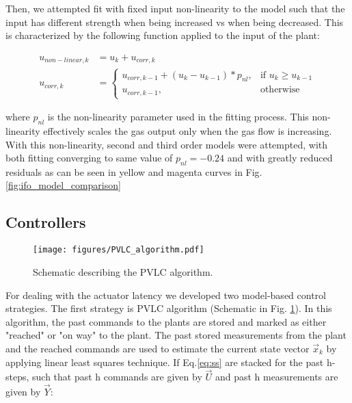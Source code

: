 Then, we attempted fit with fixed input non-linearity to the model such that the input has different strength when being increased vs when being decreased. This is characterized by the following function applied to the input of the plant:

\begin{equation}
    \begin{split}
        u_{non-linear, k} &= u_k + u_{corr, k} \\
        u_{corr, k} &= 
        \begin{cases}
            u_{corr, k-1} + (u_k - u_{k-1}) * p_{nl} ,& \text{if } u_k \geq u_{k-1}\\
            u_{corr, k-1},              & \text{otherwise}
        \end{cases}
\end{split}
\end{equation}

where $p_{nl}$ is the non-linearity parameter used in the fitting process. This non-linearity effectively scales the gas output only when the gas flow is increasing. With this non-linearity, second and third order models were attempted, with both fitting converging to same value of $p_{nl}=-0.24$ and with greatly reduced residuals as can be seen in yellow and magenta curves in Fig. \ref{fig:ifo_model_comparison}

\subsection{Controllers}{\label{subssec:controllers}}

\begin{figure}[!h]
 \centering
 \texttt{[image: figures/PVLC\_algorithm.pdf]}
 \caption{Schematic describing the \ac{PVLC} algorithm.}
 \label{fig:pvlc}
\end{figure}

For dealing with the actuator latency we developed two model-based control strategies. The first strategy is \ac{PVLC} algorithm (Schematic in Fig. \ref{fig:pvlc}). In this algorithm, the past commands to the plants are stored and marked as either "reached" or "on way" to the plant. The past stored measurements from the plant and the reached commands are used to estimate the current state vector $\vec{x}_k$ by applying linear least squares technique. If Eq.\ref{eq:ss} are stacked for the past h-steps, such that past h commands are given by $\vec{U}$ and past h measurements are given by $\vec{Y}$:

